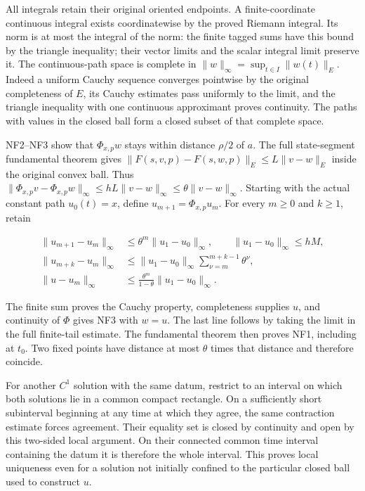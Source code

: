 \documentclass[
  11pt,
]{article}
\begin{document}
All integrals retain their original oriented endpoints. A
finite-coordinate continuous integral exists coordinatewise by the
proved Riemann integral. Its norm is at most the integral of the norm:
the finite tagged sums have this bound by the triangle inequality; their
vector limits and the scalar integral limit preserve it. The
continuous-path space is complete in
\(\|w\|_\infty=\sup_{t\in I}\|w(t)\|_E\). Indeed a uniform Cauchy
sequence converges pointwise by the original completeness of \(E\), its
Cauchy estimates pass uniformly to the limit, and the triangle
inequality with one continuous approximant proves continuity. The paths
with values in the closed ball form a closed subset of that complete
space.

NF2--NF3 show that \(\Phi_{x,p}w\) stays within distance \(\rho/2\) of
\(a\). The full state-segment fundamental theorem gives
\(\|F(s,v,p)-F(s,w,p)\|_E\leq L\|v-w\|_E\) inside the original convex
ball. Thus
\(\|\Phi_{x,p}v-\Phi_{x,p}w\|_\infty\leq hL\|v-w\|_\infty\leq\theta\|v-w\|_\infty\).
Starting with the actual constant path \(u_0(t)=x\), define
\(u_{m+1}=\Phi_{x,p}u_m\). For every \(m\geq0\) and \(k\geq1\), retain

\[
 \begin{aligned}
 \|u_{m+1}-u_m\|_\infty
   &\leq\theta^m\|u_1-u_0\|_\infty,\qquad
       \|u_1-u_0\|_\infty\leq hM,\\
 \|u_{m+k}-u_m\|_\infty
   &\leq\|u_1-u_0\|_\infty
                         \sum_{\nu=m}^{m+k-1}\theta^\nu,\\
 \|u-u_m\|_\infty
   &\leq\frac{\theta^m}{1-\theta}\|u_1-u_0\|_\infty .
 \end{aligned}
 \tag{NF4}
\]

The finite sum proves the Cauchy property, completeness supplies \(u\),
and continuity of \(\Phi\) gives NF3 with \(w=u\). The last line follows
by taking the limit in the full finite-tail estimate. The fundamental
theorem then proves NF1, including at \(t_0\). Two fixed points have
distance at most \(\theta\) times that distance and therefore coincide.

For another \(C^1\) solution with the same datum, restrict to an
interval on which both solutions lie in a common compact rectangle. On a
sufficiently short subinterval beginning at any time at which they
agree, the same contraction estimate forces agreement. Their equality
set is closed by continuity and open by this two-sided local argument.
On their connected common time interval containing the datum it is
therefore the whole interval. This proves local uniqueness even for a
solution not initially confined to the particular closed ball used to
construct \(u\).
\end{document}
